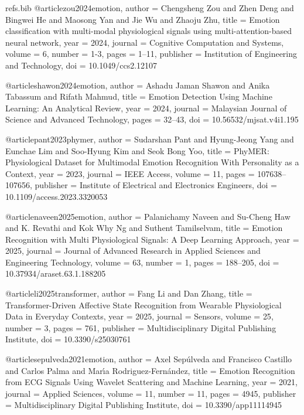\begin{filecontents*}[overwrite]{refs.bib}
@article{zou2024emotion,
  author = {Chengsheng Zou and Zhen Deng and Bingwei He and Maosong Yan and Jie Wu and Zhaoju Zhu},
  title = {{Emotion classification with multi{-}modal physiological signals using multi{-}attention{-}based neural network}},
  year = {2024},
  journal = {Cognitive Computation and Systems},
  volume = {6},
  number = {1-3},
  pages = {1--11},
  publisher = {Institution of Engineering and Technology},
  doi = {10.1049/ccs2.12107}
}

@article{shawon2024emotion,
  author = {Ashadu Jaman Shawon and Anika Tabassum and Rifath Mahmud},
  title = {{Emotion Detection Using Machine Learning: An Analytical Review}},
  year = {2024},
  journal = {Malaysian Journal of Science and Advanced Technology},
  pages = {32--43},
  doi = {10.56532/mjsat.v4i1.195}
}

@article{pant2023phymer,
  author = {Sudarshan Pant and Hyung-Jeong Yang and Eunchae Lim and Soo-Hyung Kim and Seok Bong Yoo},
  title = {{PhyMER: Physiological Dataset for Multimodal Emotion Recognition With Personality as a Context}},
  year = {2023},
  journal = {IEEE Access},
  volume = {11},
  pages = {107638--107656},
  publisher = {Institute of Electrical and Electronics Engineers},
  doi = {10.1109/access.2023.3320053}
}

@article{naveen2025emotion,
  author = {Palanichamy Naveen and Su-Cheng Haw and K. Revathi and Kok Why Ng and Suthent Tamilselvam},
  title = {{Emotion Recognition with Multi Physiological Signals: A Deep Learning Approach}},
  year = {2025},
  journal = {Journal of Advanced Research in Applied Sciences and Engineering Technology},
  volume = {63},
  number = {1},
  pages = {188--205},
  doi = {10.37934/araset.63.1.188205}
}

@article{li2025transformer,
  author = {Fang Li and Dan Zhang},
  title = {{Transformer-Driven Affective State Recognition from Wearable Physiological Data in Everyday Contexts}},
  year = {2025},
  journal = {Sensors},
  volume = {25},
  number = {3},
  pages = {761},
  publisher = {Multidisciplinary Digital Publishing Institute},
  doi = {10.3390/s25030761}
}

@article{sepulveda2021emotion,
  author = {Axel Sep{\'u}lveda and Francisco Castillo and Carlos Palma and Mar{\'\i}a Rodriguez-Fern{\'a}ndez},
  title = {{Emotion Recognition from ECG Signals Using Wavelet Scattering and Machine Learning}},
  year = {2021},
  journal = {Applied Sciences},
  volume = {11},
  number = {11},
  pages = {4945},
  publisher = {Multidisciplinary Digital Publishing Institute},
  doi = {10.3390/app11114945}
}


\end{filecontents*}

